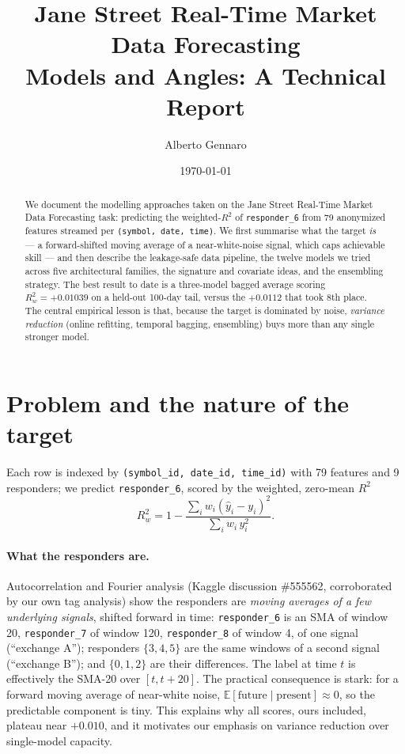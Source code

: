 \documentclass[11pt]{article}
\title{\vspace{-1.5em}Jane Street Real-Time Market Data Forecasting\\[0.3em]
\large Models and Angles: A Technical Report}
\author{Alberto Gennaro}
\date{\today}
\newcommand{\rsix}{\texttt{responder\_6}}
\newcommand{\Rw}{R^2_w}
\begin{document}
\maketitle
\vspace{-1.5em}

\begin{abstract}
\noindent
We document the modelling approaches taken on the Jane Street Real-Time Market
Data Forecasting task: predicting the weighted-$R^2$ of \rsix{} from 79
anonymized features streamed per \texttt{(symbol, date, time)}. We first
summarise what the target \emph{is} --- a forward-shifted moving average of a
near-white-noise signal, which caps achievable skill --- and then describe the
leakage-safe data pipeline, the twelve models we tried across five
architectural families, the signature and covariate ideas, and the ensembling
strategy. The best result to date is a three-model bagged average scoring
$\Rw = +0.01039$ on a held-out 100-day tail, versus the $+0.0112$ that took
8th place. The central empirical lesson is that, because the target is
dominated by noise, \emph{variance reduction} (online refitting, temporal
bagging, ensembling) buys more than any single stronger model.
\end{abstract}

\section{Problem and the nature of the target}

Each row is indexed by \texttt{(symbol\_id, date\_id, time\_id)} with 79
features and 9 responders; we predict \rsix{}, scored by the weighted, zero-mean
$R^2$
\[
\Rw = 1 - \frac{\sum_i w_i (\hat y_i - y_i)^2}{\sum_i w_i\, y_i^2}.
\]

\paragraph{What the responders are.}
Autocorrelation and Fourier analysis (Kaggle discussion \#555562, corroborated
by our own tag analysis) show the responders are \emph{moving averages of a few
underlying signals}, shifted forward in time:
\rsix{} is an SMA of window 20, \texttt{responder\_7} of window 120,
\texttt{responder\_8} of window 4, of one signal (``exchange A''); responders
$\{3,4,5\}$ are the same windows of a second signal (``exchange B''); and
$\{0,1,2\}$ are their differences. The label at time $t$ is effectively the
SMA-20 over $[t, t{+}20]$. The practical consequence is stark: for a forward
moving average of near-white noise, $\mathbb{E}[\text{future}\mid\text{present}]
\approx 0$, so the predictable component is tiny. This explains why all scores,
ours included, plateau near $+0.010$, and it motivates our emphasis on variance
reduction over single-model capacity.
\end{document}
